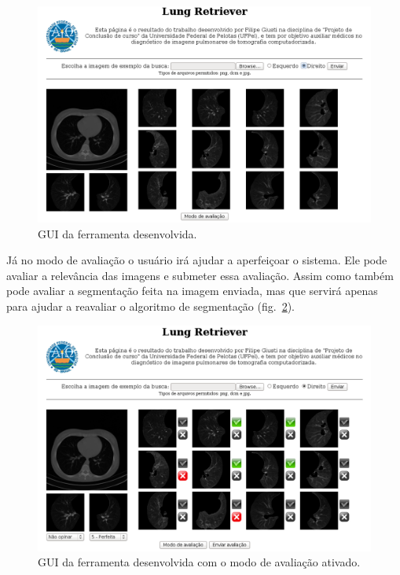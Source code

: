 \begin{figure}[!htb]
 \begin{center}
  \includegraphics[width=5.8in]{imagens/LungRetriever.png}
 \end{center}
 \caption{GUI da ferramenta desenvolvida.}
 \label{fig:lungRetriever}
\end{figure}

Já no modo de avaliação o usuário irá ajudar a aperfeiçoar o sistema. Ele pode avaliar a relevância das imagens e submeter essa avaliação. Assim como também pode avaliar a segmentação feita na imagem enviada, mas que servirá apenas para ajudar a reavaliar o algoritmo de segmentação (fig.~\ref{fig:lungRetriever:aval}).

\begin{figure}[!htb]
 \begin{center}
  \includegraphics[width=5.8in]{imagens/LungRetrieverCOMaval.png}
 \end{center}
 \caption{GUI da ferramenta desenvolvida com o modo de avaliação ativado.}
 \label{fig:lungRetriever:aval}
\end{figure}
